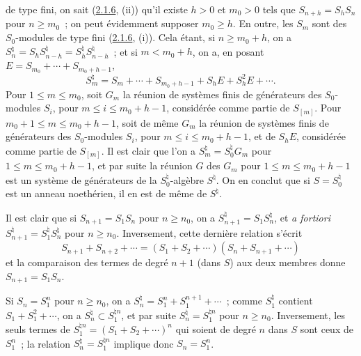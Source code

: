 de type fini, on sait (\hyperref[II.2.1.6-fr]{2.1.6}, (ii)) qu'il existe
$h>0$ et $m_0>0$ tels que $S_{n+h}=S_hS_n$ pour $n\geq m_0$~; on peut
évidemment supposer $m_0\geq h$. En outre, les $S_m$ sont des $S_0$-modules
de type fini (\hyperref[II.2.1.6-fr]{2.1.6}, (i)). Cela étant, si
$n\geq m_0+h$, on a $S_n^\natural=S_hS_{n-h}^\natural
=S_h^\natural S_{n-h}^\natural$~; et si $m<m_0+h$, on a, en posant
$E=S_{m_0}+\cdots+S_{m_0+h-1}$,
\[
  S_m^\natural=S_m+\cdots+S_{m_0+h-1}+S_hE+S_h^2E+\cdots.
\]
Pour $1\leq m\leq m_0$, soit $G_m$ la réunion de systèmes finis de
générateurs des $S_0$-modules $S_i$, pour $m\leq i\leq m_0+h-1$,
considérée comme partie de $S_{[m]}$. Pour $m_0+1\leq m\leq m_0+h-1$, soit
de même $G_m$ la réunion de systèmes finis de générateurs des $S_0$-modules
$S_i$, pour $m\leq i\leq m_0+h-1$, et de $S_hE$, considérée comme partie de
$S_{[m]}$. Il est clair que l'on a $S_m^\natural=S_0^\natural G_m$ pour
$1\leq m\leq m_0+h-1$, et par suite la réunion $G$ des $G_m$ pour
$1\leq m\leq m_0+h-1$ est un système de générateurs de la
$S_0^\natural$-algèbre $S^\natural$. On en conclut que si $S=S_0^\natural$
est un anneau noethérien, il en est de même de $S^\natural$.

\item[\rm(ii)] Il est clair que si $S_{n+1}=S_1S_n$ pour $n\geq n_0$, on a
$S_{n+1}^\natural=S_1S_n^\natural$, et \emph{a fortiori}
$S_{n+1}^\natural=S_1^\natural S_n^\natural$ pour $n\geq n_0$.
Inversement, cette dernière relation s'écrit
\[
  S_{n+1}+S_{n+2}+\cdots=(S_1+S_2+\cdots)(S_n+S_{n+1}+\cdots)
\]
et la comparaison des termes de degré $n+1$ (dans $S$) aux deux membres donne
$S_{n+1}=S_1S_n$.

\item[\rm(iii)] Si $S_n=S_1^n$ pour $n\geq n_0$, on a
$S_n^\natural=S_1^n+S_1^{n+1}+\cdots$~; comme $S_1^\natural$ contient
$S_1+S_1^2+\cdots$, on a $S_n^\natural\subset S_1^{\natural n}$, et par suite
$S_n^\natural=S_1^{\natural n}$ pour $n\geq n_0$. Inversement, les seuls
termes de $S_1^{\natural n}=(S_1+S_2+\cdots)^n$ qui soient de degré $n$ dans
$S$ sont ceux de $S_1^n$~; la relation $S_n^\natural=S_1^{\natural n}$
implique donc $S_n=S_1^n$.

